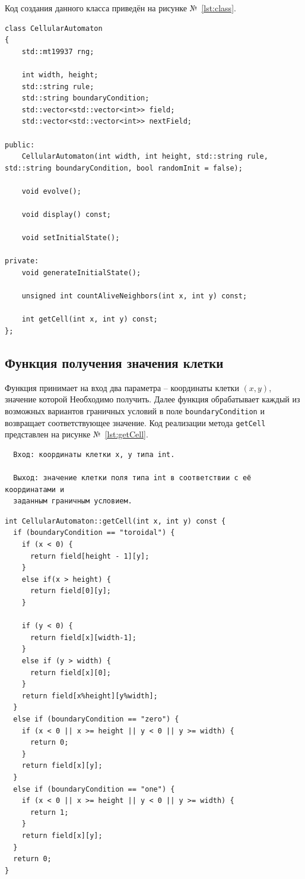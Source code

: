 \documentclass[a4paper, final]{article}
\begin{document}
Код создания данного класса приведён на рисунке №~\ref{lst:class}.

\begin{lstlisting}[caption={Код создания класса \texttt{CellularAutomaton}}, 
  label={lst:class}]
class CellularAutomaton
{
    std::mt19937 rng;

    int width, height;
    std::string rule;
    std::string boundaryCondition;
    std::vector<std::vector<int>> field;
    std::vector<std::vector<int>> nextField;

public:
    CellularAutomaton(int width, int height, std::string rule, std::string boundaryCondition, bool randomInit = false);

    void evolve();

    void display() const;

    void setInitialState();
    
private:
    void generateInitialState();

    unsigned int countAliveNeighbors(int x, int y) const;

    int getCell(int x, int y) const;
};  
\end{lstlisting}

\subsection{Функция получения значения клетки}
Функция принимает на вход два параметра -- координаты клетки $(x, y)$, значение которой Необходимо
получить. Далее функция обрабатывает каждый из возможных вариантов граничных условий в поле 
\texttt{boundaryCondition} и возвращает соответствующее значение. Код реализации метода \texttt{getCell}
представлен на рисунке №~\ref{lst:getCell}.

\begin{verbatim}
  Вход: координаты клетки x, y типа int.
  
  Выход: значение клетки поля типа int в соответствии с её координатами и 
  заданным граничным условием.
\end{verbatim}

\begin{lstlisting}[caption={Код реализации метода \texttt{getCell}}, label={lst:getCell}]
int CellularAutomaton::getCell(int x, int y) const {
  if (boundaryCondition == "toroidal") {
    if (x < 0) {
      return field[height - 1][y];
    }
    else if(x > height) {
      return field[0][y];
    }

    if (y < 0) {
      return field[x][width-1];
    }
    else if (y > width) {
      return field[x][0];
    }
    return field[x%height][y%width];
  }
  else if (boundaryCondition == "zero") {
    if (x < 0 || x >= height || y < 0 || y >= width) {
      return 0;
    }
    return field[x][y];
  }
  else if (boundaryCondition == "one") {
    if (x < 0 || x >= height || y < 0 || y >= width) {
      return 1;
    }
    return field[x][y];
  }
  return 0;
}
\end{lstlisting}
\end{document}

